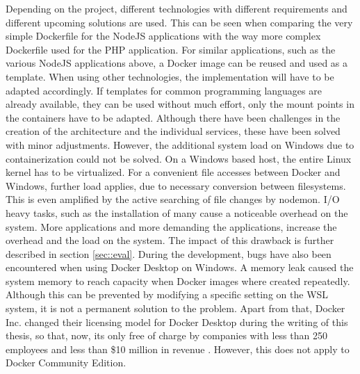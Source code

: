         Depending on the project, different technologies with different requirements and different upcoming solutions are used. This can be seen when comparing the very simple Dockerfile for the NodeJS applications with the way more complex Dockerfile used for the PHP application. For similar applications, such as the various NodeJS applications above, a Docker image can be reused and used as a template. When using other technologies, the implementation will have to be adapted accordingly. If templates for common programming languages are already available, they can be used without much effort, only the mount points in the containers have to be adapted. \newline
        Although there have been challenges in the creation of the architecture and the individual services, these have been solved with minor adjustments. However, the additional system load on Windows due to containerization could not be solved. On a Windows based host, the entire Linux kernel has to be virtualized. For a convenient file accesses between Docker and Windows, further load applies, due to necessary conversion between filesystems. This is even amplified by the active searching of file changes by nodemon. \acs{I/O} heavy tasks, such as the installation of many  cause a noticeable overhead on the system. More applications and more demanding the applications, increase the overhead and the load on the system. The impact of this drawback is further described in section \ref{sec::eval}. \newline
        During the development, bugs have also been encountered when using Docker Desktop on Windows. A memory leak caused the system memory to reach capacity when Docker images where created repeatedly. Although this can be prevented by modifying a specific setting on the \ac{WSL} system, it is not a permanent solution to the problem. Apart from that, Docker Inc. changed their licensing model for Docker Desktop during the writing of this thesis, so that, now, its only free of charge by companies with less than 250 employees and less than \$10 million in revenue \cite{dockerblog}. However, this does not apply to Docker Community Edition.

